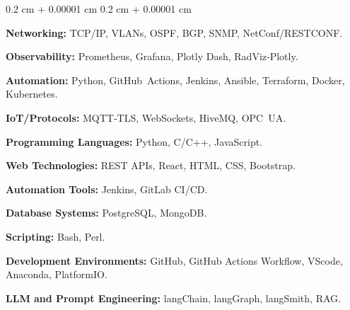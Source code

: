 \documentclass[10pt, letterpaper]{article}
\newenvironment{onecolentry}{
    \begin{adjustwidth}{
        0.2 cm + 0.00001 cm
    }{
        0.2 cm + 0.00001 cm
    }
}{
    \end{adjustwidth}
} %
\begin{document}
  \vspace{- 0.5 cm}
    \begin{onecolentry}
\item \textbf{Networking:} TCP/IP, VLANs, OSPF, BGP, SNMP, NetConf/RESTCONF.\  
\item \textbf{Observability:} Prometheus, Grafana, Plotly Dash, RadViz‑Plotly.\

\item \textbf{Automation:} Python, GitHub Actions, Jenkins, Ansible, Terraform, Docker, Kubernetes.\
\item \textbf{IoT/Protocols:} MQTT‑TLS, WebSockets, HiveMQ, OPC UA.\

\item \textbf{Programming Languages:} Python, C/C++, JavaScript.
\item \textbf{Web Technologies:} REST APIs, React, HTML, CSS, Bootstrap.
\item \textbf{Automation Tools:} Jenkins, GitLab CI/CD.
\item \textbf{Database Systems:} PostgreSQL, MongoDB.
\item \textbf{Scripting:} Bash, Perl.
\item \textbf{Development Environments:} GitHub, GitHub Actions Workflow, VScode, Anaconda, PlatformIO.
\item \textbf{LLM and Prompt Engineering:} langChain, langGraph, langSmith, RAG.
  \end{onecolentry}
\end{document}
